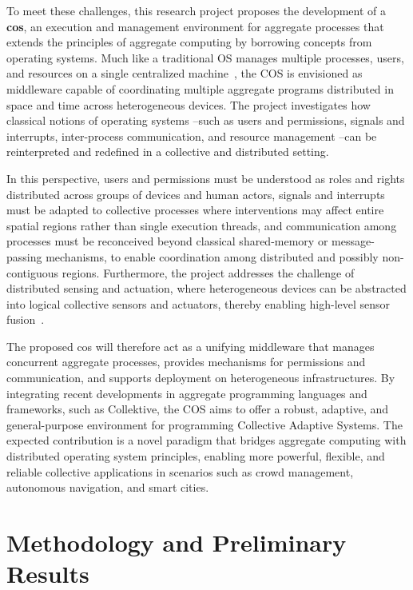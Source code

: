 \documentclass[runningheads]{llncs}
\begin{document}
    To meet these challenges,
    this research project proposes the development of a \textbf{\ac{cos}},
    an execution and management environment for aggregate processes that extends the principles of aggregate computing by borrowing concepts from operating systems.
    Much like a traditional OS manages multiple processes, users,
    and resources on a single centralized machine~\cite{DBLP:journals/csur/TanenbaumR85},
    the COS is envisioned as middleware capable of coordinating multiple aggregate programs distributed in space and time across heterogeneous devices.
    The project investigates how classical notions of operating systems --such as users and permissions, signals and interrupts,
    inter-process communication, and resource management --can be reinterpreted and redefined in a collective and distributed setting.

    In this perspective,
    users and permissions must be understood as roles and rights distributed across groups of devices and human actors,
    signals and interrupts must be adapted to collective processes where interventions may affect entire spatial regions rather than single execution threads,
    and communication among processes must be reconceived beyond classical shared-memory or message-passing mechanisms,
    to enable coordination among distributed and possibly non-contiguous regions.
    Furthermore,
    the project addresses the challenge of distributed sensing and actuation,
    where heterogeneous devices can be abstracted into logical collective sensors and actuators,
    thereby enabling high-level sensor fusion~\cite{DBLP:journals/arc/Sasiadek02}.

    The proposed \ac{cos} will therefore act as a unifying middleware that manages concurrent aggregate processes,
    provides mechanisms for permissions and communication,
    and supports deployment on heterogeneous infrastructures.
    By integrating recent developments in aggregate programming languages and frameworks,
    such as Collektive, the COS aims to offer a robust, adaptive,
    and general-purpose environment for programming Collective Adaptive Systems.
    The expected contribution is a novel paradigm that bridges aggregate computing with distributed operating system principles,
    enabling more powerful, flexible,
    and reliable collective applications in scenarios such as crowd management, autonomous navigation, and smart cities.

    \section{Methodology and Preliminary Results}\label{sec:methodology}
\end{document}
